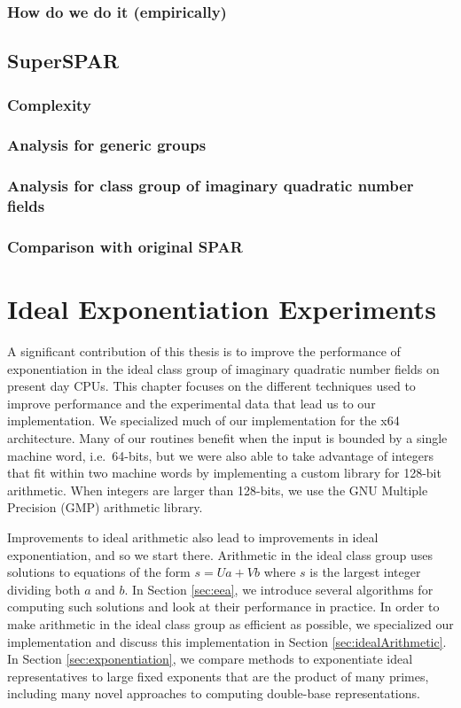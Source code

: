 \documentclass{ucalgthes1}
\theoremstyle{definition}
\begin{document}
\subsection{How do we do it (empirically)}


\bigbreak
\section{SuperSPAR}
\label{sec:superSpar}

\subsection{Complexity}
\subsection{Analysis for generic groups}
\subsection{Analysis for class group of imaginary quadratic number fields}
\subsection{Comparison with original SPAR}


\chapter{Ideal Exponentiation Experiments}
\label{chap:idealPowExperiments}

A significant contribution of this thesis is to improve the performance of exponentiation in the ideal class group of imaginary quadratic number fields on present day CPUs.  This chapter focuses on the different techniques used to improve performance and the experimental data that lead us to our implementation.  We specialized much of our implementation for the x64 architecture.  Many of our routines benefit when the input is bounded by a single machine word, i.e.\ 64-bits, but we were also able to take advantage of integers that fit within two machine words by implementing a custom library for 128-bit arithmetic.  When integers are larger than 128-bits, we use the GNU Multiple Precision (GMP) arithmetic library.

Improvements to ideal arithmetic also lead to improvements in ideal exponentiation, and so we start there. Arithmetic in the ideal class group uses solutions to equations of the form $s = Ua + Vb$ where $s$ is the largest integer dividing both $a$ and $b$. In Section \ref{sec:eea}, we introduce several algorithms for computing such solutions and look at their performance in practice. In order to make arithmetic in the ideal class group as efficient as possible, we specialized our implementation and discuss this implementation in Section \ref{sec:idealArithmetic}. In Section \ref{sec:exponentiation}, we compare methods to exponentiate ideal representatives to large fixed exponents that are the product of many primes, including many novel approaches to computing double-base representations.
\end{document}
